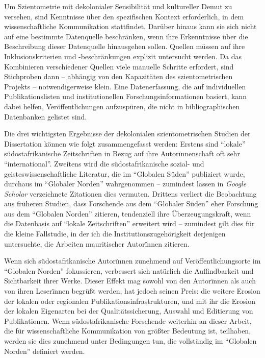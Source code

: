 \documentclass[a4paper,
fontsize=11pt,
oneside,
numbers=noperiodatend,
parskip=half-,
bibliography=totoc,
final
]{scrartcl}
\begin{document}
Um Szientometrie mit dekolonialer Sensibilität und kultureller Demut zu
versehen, sind Kenntnisse über den spezifischen Kontext erforderlich, in
dem wissenschaftliche Kommunikation stattfindet. Darüber hinaus kann sie
sich nicht auf eine bestimmte Datenquelle beschränken, wenn ihre
Erkenntnisse über die Beschreibung dieser Datenquelle hinausgehen
sollen. Quellen müssen auf ihre Inklusionskriterien und -beschränkungen
explizit untersucht werden. Da das Kombinieren verschiedener Quellen
viele manuelle Schritte erfordert, sind Stichproben dann -- abhängig von
den Kapazitäten des szientometrischen Projekts -- notwendigerweise
klein. Eine Datenerfassung, die auf individuellen Publikationslisten und
institutionellen Forschungsinformationen basiert, kann dabei helfen,
Veröffentlichungen aufzuspüren, die nicht in bibliographischen
Datenbanken gelistet sind.

Die drei wichtigsten Ergebnisse der dekolonialen szientometrischen
Studien der Dissertation können wie folgt zusammengefasst werden:
Erstens sind \enquote{lokale} südostafrikanische Zeitschriften in Bezug
auf ihre Autorïnnenschaft oft sehr \enquote{international}. Zweitens
wird die südostafrikanische sozial- und geisteswissenschaftliche
Literatur, die im \enquote{Globalen Süden} publiziert wurde, durchaus im
\enquote{Globaler Norden} wahrgenommen -- zumindest lassen in
\emph{Google Scholar} verzeichnete Zitationen dies vermuten. Drittens
verliert die Beobachtung aus früheren Studien, dass Forschende aus dem
\enquote{Globaler Süden} eher Forschung aus dem \enquote{Globalen
Norden} zitieren, tendenziell ihre Überzeugungskraft, wenn die
Datenbasis auf \enquote{lokale Zeitschriften} erweitert wird --
zumindest gilt dies für die kleine Fallstudie, in der ich die
Institutionszugehörigkeit derjenigen untersuchte, die Arbeiten
mauritischer Autorïnnen zitieren.

Wenn sich südostafrikanische Autorïnnen zunehmend auf
Veröffentlichungsorte im \enquote{Globalen Norden} fokussieren,
verbessert sich natürlich die Auffindbarkeit und Sichtbarkeit ihrer
Werke. Dieser Effekt mag sowohl von den Autorïnnen als auch von ihren
Leserïnnen begrüßt werden, hat jedoch seinen Preis: die weitere Erosion
der lokalen oder regionalen Publikationsinfrastrukturen, und mit ihr die
Erosion der lokalen Eigenarten bei der Qualitätssicherung, Auswahl und
Editierung von Publikationen. Wenn südostafrikanische Forschende
weiterhin an dieser Arbeit, die für wissenschaftliche Kommunikation von
größter Bedeutung ist, teilhaben, werden sie dies zunehmend unter
Bedingungen tun, die vollständig im \enquote{Globalen Norden} definiert
werden.
\end{document}

